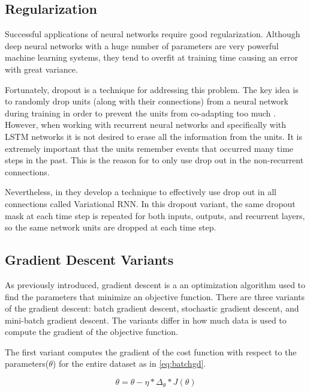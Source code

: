 \subsection{Regularization}

Successful applications of neural networks require good regularization. Although deep neural networks with a huge number of parameters are very powerful machine learning systems, they tend to overfit at training time causing an error with great variance. 

Fortunately, dropout is a technique for addressing this problem. The key idea is to randomly drop units (along with their connections) from a neural network during training in order to prevent the units from co-adapting too much \cite{srivastava2013improving}. However, when working with recurrent neural networks and specifically with LSTM networks it is not desired to erase all the information from the units. It is extremely important that the units remember events that occurred many time steps in the past. This is the reason for \cite{zaremba2014recurrent} to only use drop out in the non-recurrent connections. 

Nevertheless, in \cite{gal2015theoretically} they develop a technique to effectively use drop out in all connections called Variational RNN. In this dropout variant, the same dropout mask at each time step is repeated for both inputs, outputs, and recurrent layers, so the same network units are dropped at each time step. 

\subsection{Gradient Descent Variants}
As previously introduced, gradient descent is a an optimization algorithm used to find the parameters that minimize an objective function. There are three variants of the gradient descent: batch gradient descent, stochastic gradient descent, and mini-batch gradient descent. The variants differ in how much data is used to compute the gradient of the objective function. 

The first variant computes the gradient of the cost function with respect to the parameters($\theta$) for the entire dataset as in \ref{eq:batchgd}.

\begin{equation} \label{eq:batchgd}
\theta=\theta-\eta * \Delta_\theta * J(\theta)
\end{equation}

